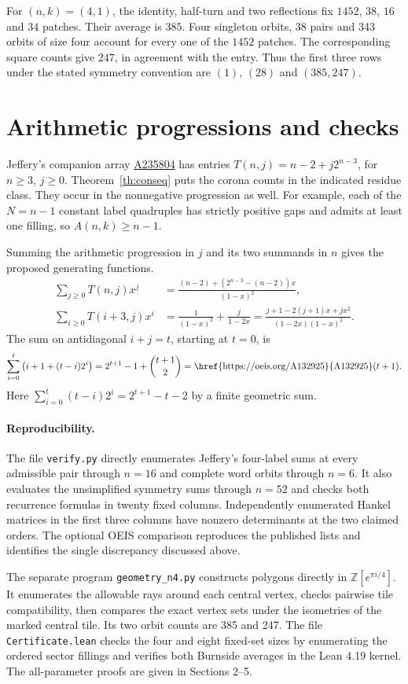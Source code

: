 \documentclass[11pt,letterpaper]{article}
\newcommand{\oid}[1]{\href{https://oeis.org/A#1}{A#1}}
\newcommand{\cc}[2]{\binom{#1}{#2}}
\begin{document}
For $(n,k)=(4,1)$, the identity, half-turn and two reflections fix $1452$, $38$, $16$ and $34$ patches. Their average is $385$. Four singleton orbits, 38 pairs and 343 orbits of size four account for every one of the $1452$ patches. The corresponding square counts give $247$, in agreement with the entry. Thus the first three rows under the stated symmetry convention are $(1)$, $(28)$ and $(385,247)$.

\newpage
\section{Arithmetic progressions and checks}

Jeffery's companion array \oid{235804} has entries $T(n,j)=n-2+j2^{n-3}$, for $n\ge3$, $j\ge0$. Theorem~\ref{th:conseq} puts the corona counts in the indicated residue class. They occur in the nonnegative progression as well. For example, each of the $N=n-1$ constant label quadruples has strictly positive gaps and admits at least one filling, so $A(n,k)\ge n-1$.

Summing the arithmetic progression in $j$ and its two summands in $n$ gives the proposed generating functions.
\begin{align*}
 \sum_{j\ge0}T(n,j)x^j
   &=\frac{(n-2)+(2^{n-3}-(n-2))x}{(1-x)^2},\\
 \sum_{i\ge0}T(i+3,j)x^i
   &=\frac{1}{(1-x)^2}+\frac{j}{1-2x}
     =\frac{j+1-2(j+1)x+jx^2}{(1-2x)(1-x)^2}.
\end{align*}
The sum on antidiagonal $i+j=t$, starting at $t=0$, is
\[
 \sum_{i=0}^t\big(i+1+(t-i)2^i\big)
    =2^{t+1}-1+\cc{t+1}{2}=\text{\oid{132925}}(t+1).
\]
Here $\sum_{i=0}^t(t-i)2^i=2^{t+1}-t-2$ by a finite geometric sum.

\paragraph{Reproducibility.}
The file \texttt{verify.py} directly enumerates Jeffery's four-label sums at every admissible pair through $n=16$ and complete word orbits through $n=6$. It also evaluates the unsimplified symmetry sums through $n=52$ and checks both recurrence formulas in twenty fixed columns. Independently enumerated Hankel matrices in the first three columns have nonzero determinants at the two claimed orders. The optional OEIS comparison reproduces the published lists and identifies the single discrepancy discussed above.

The separate program \texttt{geometry\_n4.py} constructs polygons directly in $\mathbb Z[e^{\pi i/4}]$. It enumerates the allowable rays around each central vertex, checks pairwise tile compatibility, then compares the exact vertex sets under the isometries of the marked central tile. Its two orbit counts are 385 and 247. The file \texttt{Certificate.lean} checks the four and eight fixed-set sizes by enumerating the ordered sector fillings and verifies both Burnside averages in the Lean 4.19 kernel. The all-parameter proofs are given in Sections 2--5.
\end{document}
